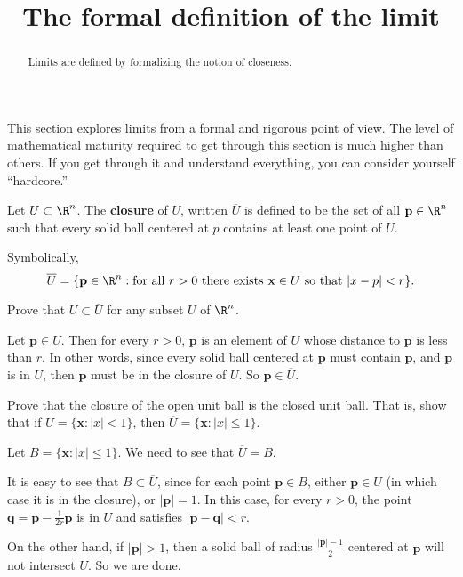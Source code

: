\documentclass{ximera}
\title{ The formal definition of the limit}
\begin{document}
\begin{abstract}
	Limits are defined by formalizing the notion of closeness.
\end{abstract}

This  section explores limits from a formal and rigorous point of view.   
The level of mathematical maturity required to get through this section is much higher than others. 
If you get through it and understand everything, you can consider yourself ``hardcore.''

\begin{definition}
	Let $U \subset \R^n$.  The \textbf{closure} of $U$, written $\overline{U}$ is defined to be the set of all $\mathbf{p} \in \R^n$ such that
	every solid ball centered at $p$ contains at least one point of $U$.

        Symbolically,
	$$\overline{U} = \{ \mathbf{p} \in \R^n : \text{for all $r>0$ there exists $\mathbf{x} \in U$ so that $|x-p|<r$} \}.$$
\end{definition}

Prove that $U \subset \overline{U}$ for any subset $U$ of $\R^n$.
\begin{free-response}
	
	Let $\mathbf{p} \in U$.  Then for every $r >0$, $\mathbf{p}$ is an element of $U$ whose distance to $\mathbf{p}$ is less than $r$.  In other words,
	since every solid ball centered at $\mathbf{p}$ must contain $\mathbf{p}$, and $\mathbf{p}$ is in $U$, then $\mathbf{p}$ must be in the closure of $U$. 
	So $\mathbf{p} \in \overline{U}$.
	
\end{free-response}


Prove that the closure of the open unit ball is the closed unit ball.  That is, show that if $U = \{\mathbf{x}:|x|<1\}$, then $\overline{U}  = \{\mathbf{x}:|x|\leq 1\}$.

\begin{free-response}
	 Let $B = \{\mathbf{x}:|x|\leq 1\}$.  We need to see that $\overline{U} = B$.
	 
	 It is easy to see that $B \subset \overline{U}$, since for each point $\mathbf{p} \in B$, either $\mathbf{p} \in U$ (in which case it is in the closure), 
	 or $|\mathbf{p}| = 1$.  In this case, for every $r > 0$, the point $\mathbf{q} = \mathbf{p} - \frac{1}{2r}\mathbf{p}$ is in $U$ and satisfies 
	  $|\mathbf{p} - \mathbf{q}|<r$.
	  
	  On the other hand, if $|\mathbf{p}|>1$, then a solid ball of radius $\frac{|\mathbf{p}|-1}{2}$ centered at $\mathbf{p}$ will not intersect $U$.  So we are done.
\end{free-response}
\end{document}
